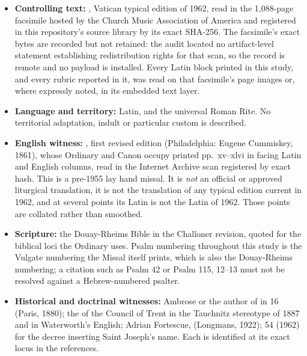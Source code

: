 \begin{itemize}[itemsep=0.2em]
\item \textbf{Controlling text:} , Vatican
typical edition of 1962, read in the 1{,}088-page facsimile hosted by the
Church Music Association of America and registered in this repository's source
library by its exact SHA-256. The facsimile's exact bytes are recorded but not
retained: the audit located no artifact-level statement establishing
redistribution rights for that scan, so the record is remote and no payload is
installed. Every Latin block printed in this study, and every rubric reported
in it, was read on that facsimile's page images or, where expressly noted, in
its embedded text layer.
\item \textbf{Language and territory:} Latin, and the universal Roman Rite. No
territorial adaptation, indult or particular custom is described.
\item \textbf{English witness:} , first revised edition
(Philadelphia: Eugene Cummiskey, 1861), whose Ordinary and Canon occupy printed
pp.~xv--xlvi in facing Latin and English columns, read in the Internet Archive
scan registered by exact hash. This is a pre-1955 lay hand missal. It is
\emph{not} an official or approved liturgical translation, it is not the
translation of any typical edition current in 1962, and at several points its
Latin is not the Latin of 1962. Those points are collated rather than smoothed.
\item \textbf{Scripture:} the Douay-Rheims Bible in the Challoner revision,
quoted for the biblical loci the Ordinary uses. Psalm numbering throughout this
study is the Vulgate numbering the Missal itself prints, which is also the
Douay-Rheims numbering; a citation such as Psalm 42 or Psalm 115, 12--13 must
not be resolved against a Hebrew-numbered psalter.
\item \textbf{Historical and doctrinal witnesses:} Ambrose or the author of
 in  16 (Paris, 1880); the
 of the Council of Trent in the Tauchnitz stereotype
of 1887 and in Waterworth's English; Adrian Fortescue,  (Longmans, 1922);  54 (1962)
for the decree inserting Saint Joseph's name. Each is identified at its exact
locus in the references.
\end{itemize}

